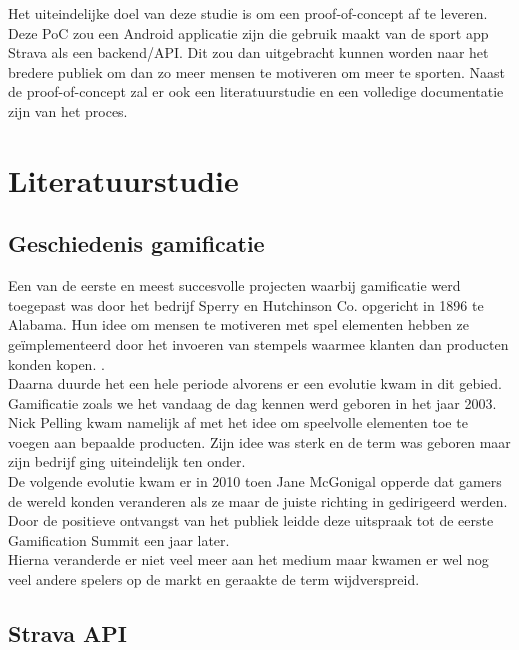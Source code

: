 Het uiteindelijke doel van deze studie is om een proof-of-concept af te leveren. Deze PoC zou een Android applicatie zijn die gebruik maakt van de sport app Strava als een backend/API. Dit zou dan uitgebracht kunnen worden naar het bredere publiek om dan zo meer mensen te motiveren om meer te sporten. Naast de proof-of-concept zal er ook een literatuurstudie en een volledige documentatie zijn van het proces.


\section{Literatuurstudie}%
\label{sec:state-of-the-art}

\subsection{Geschiedenis gamificatie}

Een van de eerste en meest succesvolle projecten waarbij gamificatie werd toegepast was door het bedrijf Sperry en Hutchinson Co. opgericht in 1896 te Alabama. Hun idee om mensen te motiveren met spel elementen hebben ze geïmplementeerd door het invoeren van stempels waarmee klanten dan producten konden kopen. \autocite{Christians2018}. \\

Daarna duurde het een hele periode alvorens er een evolutie kwam in dit gebied. Gamificatie zoals we het vandaag de dag kennen werd geboren in het jaar 2003. Nick Pelling kwam namelijk af met het idee om speelvolle elementen toe te voegen aan bepaalde producten. Zijn idee was sterk en de term was geboren maar zijn bedrijf ging uiteindelijk ten onder. \autocite{Khaitova2021} \\

De volgende evolutie kwam er in 2010 toen Jane McGonigal opperde dat gamers de wereld konden veranderen als ze maar de juiste richting in gedirigeerd werden. Door de positieve ontvangst van het publiek leidde deze uitspraak tot de eerste Gamification Summit een jaar later. \autocite{Christians2018} \\

Hierna veranderde er niet veel meer aan het medium maar kwamen er wel nog veel andere spelers op de markt en geraakte de term wijdverspreid.

\subsection{Strava API}

